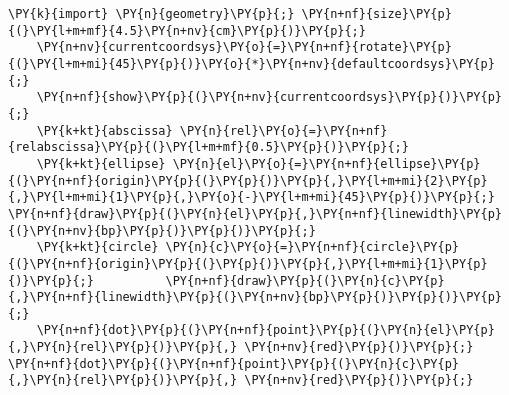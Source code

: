 \begin{Verbatim}[commandchars=\\\{\}]
    \PY{k}{import} \PY{n}{geometry}\PY{p}{;} \PY{n+nf}{size}\PY{p}{(}\PY{l+m+mf}{4.5}\PY{n+nv}{cm}\PY{p}{)}\PY{p}{;}
    \PY{n+nv}{currentcoordsys}\PY{o}{=}\PY{n+nf}{rotate}\PY{p}{(}\PY{l+m+mi}{45}\PY{p}{)}\PY{o}{*}\PY{n+nv}{defaultcoordsys}\PY{p}{;}
    \PY{n+nf}{show}\PY{p}{(}\PY{n+nv}{currentcoordsys}\PY{p}{)}\PY{p}{;}
    \PY{k+kt}{abscissa} \PY{n}{rel}\PY{o}{=}\PY{n+nf}{relabscissa}\PY{p}{(}\PY{l+m+mf}{0.5}\PY{p}{)}\PY{p}{;}
    \PY{k+kt}{ellipse} \PY{n}{el}\PY{o}{=}\PY{n+nf}{ellipse}\PY{p}{(}\PY{n+nf}{origin}\PY{p}{(}\PY{p}{)}\PY{p}{,}\PY{l+m+mi}{2}\PY{p}{,}\PY{l+m+mi}{1}\PY{p}{,}\PY{o}{-}\PY{l+m+mi}{45}\PY{p}{)}\PY{p}{;} \PY{n+nf}{draw}\PY{p}{(}\PY{n}{el}\PY{p}{,}\PY{n+nf}{linewidth}\PY{p}{(}\PY{n+nv}{bp}\PY{p}{)}\PY{p}{)}\PY{p}{;}
    \PY{k+kt}{circle} \PY{n}{c}\PY{o}{=}\PY{n+nf}{circle}\PY{p}{(}\PY{n+nf}{origin}\PY{p}{(}\PY{p}{)}\PY{p}{,}\PY{l+m+mi}{1}\PY{p}{)}\PY{p}{;}          \PY{n+nf}{draw}\PY{p}{(}\PY{n}{c}\PY{p}{,}\PY{n+nf}{linewidth}\PY{p}{(}\PY{n+nv}{bp}\PY{p}{)}\PY{p}{)}\PY{p}{;}
    \PY{n+nf}{dot}\PY{p}{(}\PY{n+nf}{point}\PY{p}{(}\PY{n}{el}\PY{p}{,}\PY{n}{rel}\PY{p}{)}\PY{p}{,} \PY{n+nv}{red}\PY{p}{)}\PY{p}{;} \PY{n+nf}{dot}\PY{p}{(}\PY{n+nf}{point}\PY{p}{(}\PY{n}{c}\PY{p}{,}\PY{n}{rel}\PY{p}{)}\PY{p}{,} \PY{n+nv}{red}\PY{p}{)}\PY{p}{;}
\end{Verbatim}
